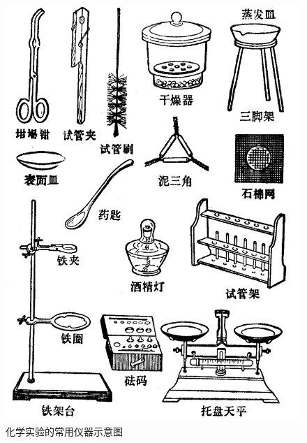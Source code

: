 \begin{figure}[H]
    \centering
    \includegraphics[width=\textwidth]{../pic/czhx1-xssy-yiqi-2.png}
    \caption*{化学实验的常用仪器示意图}
\end{figure}

